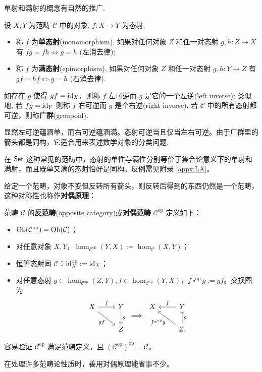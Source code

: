 单射和满射的概念有自然的推广.
\begin{definition}
	设 $X, Y$ 为范畴 $\mathcal{C}$ 中的对象, $f: X \to Y$ 为态射.
	\begin{itemize}
		\item 称 $f$ 为\textbf{单态射}(monomorphism), 如果对任何对象 $Z$ 和任一对态射 $g, h: Z \to X$ 有 $fg = fh \iff g=h$ (左消去律);
		\item 称 $f$ 为\textbf{满态射}(epimorphism), 如果对任何对象 $Z$ 和任一对态射 $g, h: Y \to Z$ 有 $gf = hf \iff g=h$ (右消去律).
	\end{itemize}
	如存在 $g$ 使得 $gf=\mathrm{id}_X$，则称 $f$ 左可逆而 $g$ 是它的一个左逆(left inverse); 类似地, 若 $fg = \mathrm{id}_Y$ 则称 $f$ 右可逆而 $g$ 是个右逆(right inverse).
	若 $\mathcal{C}$ 中的所有态射都可逆，则称\textbf{广群}(groupoid).
\end{definition}
显然左可逆蕴涵单，而右可逆蕴涵满。态射可逆当且仅当左右可逆。由于广群里的箭头都是同构，它适合用来表述数学对象的分类问题.

在 $\mathsf{Set}$ 这种常见的范畴中，态射的单性与满性分别等价于集合论意义下的单射和满射，而且既单又满的态射恰好是同构。反例需见附录 \ref{appx:LA}。

给定一个范畴，对象不变但反转所有箭头，则反转后得到的东西仍然是一个范畴，这种对称性也称作\textbf{对偶原理}：
\begin{definition}
    范畴 $\mathcal{C}$ 的\textbf{反范畴}(opposite category)或\textbf{对偶范畴} $\mathcal{C}^\mathrm{op}$ 定义如下：
    \begin{itemize}
        \item $\operatorname{Ob}(\mathcal{C}^{\mathrm{op}}) = \operatorname{Ob}(\mathcal{C})$；
        \item 对任意对象 $X, Y$，$\hom_{\mathcal{C}^{\mathrm{op}}}(Y, X) := \hom_{\mathcal{C}}(X, Y)$；
        \item 恒等态射同 $\mathcal{C}$：$\mathrm{id}^\mathrm{op}_X:=\mathrm{id}_X$；
        \item 对任意态射 $g \in \hom_{\mathcal{C}^{\mathrm{op}}}(Z, Y), f \in \hom_{\mathcal{C}^{\mathrm{op}}}(Y, X)$，$f \circ^\mathrm{op} g:=gf$。交换图为
        \[
\begin{tikzcd}
X \arrow[r,"f"] \arrow[dr,"g f"'] & Y \arrow[d,"g"] \\
& Z
\end{tikzcd}
\im
\begin{tikzcd}
X & Y \arrow[l,"f"'] \\
& Z \arrow[u,"g"'] \arrow[ul,"f\circ^\mathrm{op} g"].
\end{tikzcd}
\]
    \end{itemize}
    容易验证 $\mathcal{C}^\mathrm{op}$ 满足范畴定义，且 $(\mathcal{C}^\mathrm{op})^{\mathrm{op}} = \mathcal{C}$。
\end{definition}
在处理许多范畴论性质时，善用对偶原理能省事不少。


